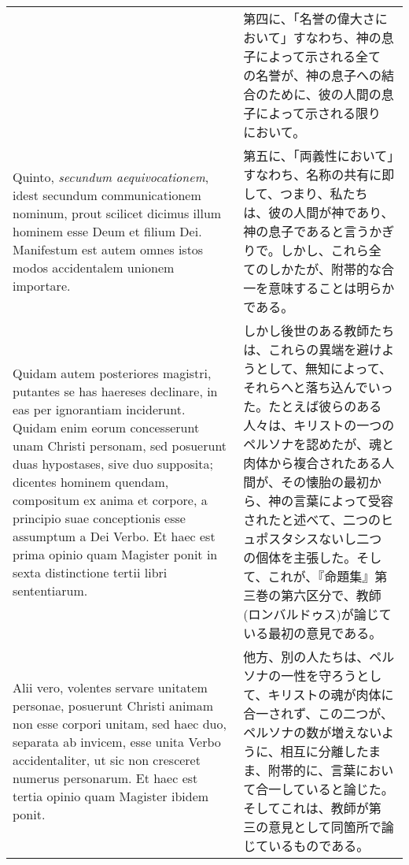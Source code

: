 \documentclass[10pt]{jsarticle} %
\begin{document}
\begin{longtable}{p{21em}p{21em}}
&

第四に、「名誉の偉大さにおいて」すなわち、神の息子によって示される全て
の名誉が、神の息子への結合のために、彼の人間の息子によって示される限り
において。


\\

Quinto, {\itshape secundum aequivocationem}, idest secundum
communicationem nominum, prout scilicet dicimus illum hominem esse
Deum et filium Dei. Manifestum est autem omnes istos modos
accidentalem unionem importare.

&

第五に、「両義性において」すなわち、名称の共有に即して、つまり、私たち
は、彼の人間が神であり、神の息子であると言うかぎりで。しかし、これら全
てのしかたが、附帯的な合一を意味することは明らかである。


\\

Quidam autem posteriores magistri, putantes se has haereses declinare,
in eas per ignorantiam inciderunt. Quidam enim eorum concesserunt unam
Christi personam, sed posuerunt duas hypostases, sive duo supposita;
dicentes hominem quendam, compositum ex anima et corpore, a principio
suae conceptionis esse assumptum a Dei Verbo.  Et haec est prima
opinio quam Magister ponit in sexta distinctione tertii libri
sententiarum.

&

しかし後世のある教師たちは、これらの異端を避けようとして、無知によって、
それらへと落ち込んでいった。たとえば彼らのある人々は、キリストの一つの
ペルソナを認めたが、魂と肉体から複合されたある人間が、その懐胎の最初か
ら、神の言葉によって受容されたと述べて、二つのヒュポスタシスないし二つ
の個体を主張した。そして、これが、『命題集』第三巻の第六区分で、教師
(ロンバルドゥス)が論じている最初の意見である。


\\

Alii vero, volentes servare unitatem personae, posuerunt Christi
animam non esse corpori unitam, sed haec duo, separata ab invicem,
esse unita Verbo accidentaliter, ut sic non cresceret numerus
personarum. Et haec est tertia opinio quam Magister ibidem ponit.

&

他方、別の人たちは、ペルソナの一性を守ろうとして、キリストの魂が肉体に
合一されず、この二つが、ペルソナの数が増えないように、相互に分離したま
ま、附帯的に、言葉において合一していると論じた。そしてこれは、教師が第
三の意見として同箇所で論じているものである。


\end{longtable}
\end{document}
